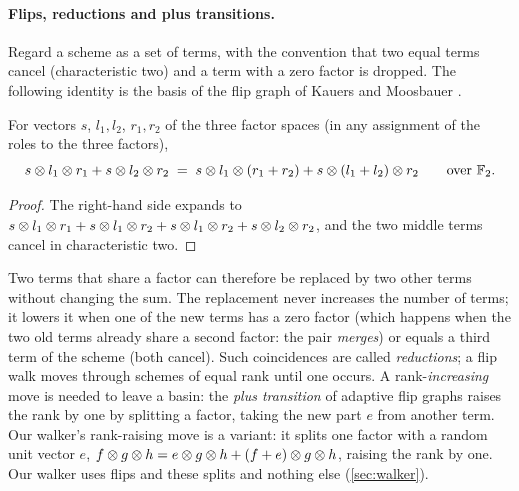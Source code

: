 \paragraph{Flips, reductions and plus transitions.}
Regard a scheme as a set of terms, with the convention that two equal terms cancel (characteristic two) and a term with a zero
factor is dropped. The following identity is the basis of the flip graph of Kauers and Moosbauer \cite{kauers2023flip}.

\begin{lemma}[flip]\label{lem:flip}
For vectors $s$, $l_1,l_2$, $r_1,r_2$ of the three factor spaces (in any assignment of the roles to the three factors),
\[
  s\otimes l_1\otimes r_1 + s\otimes l_2\otimes r_2
  \;=\; s\otimes l_1\otimes (r_1+r_2) + s\otimes (l_1+l_2)\otimes r_2
  \qquad\text{over }{\mathbb{F}_2} .
\]
\end{lemma}
\begin{proof}
The right-hand side expands to $s\otimes l_1\otimes r_1 + s\otimes l_1\otimes r_2 + s\otimes l_1\otimes r_2 + s\otimes l_2\otimes r_2$, and the
two middle terms cancel in characteristic two.
\end{proof}

Two terms that share a factor can therefore be replaced by two other terms without changing the sum. The replacement never
increases the number of terms; it lowers it when one of the new terms has a zero factor (which happens when the two old terms
already share a second factor: the pair \emph{merges}) or equals a third term of the scheme (both cancel). Such coincidences are called
\emph{reductions}; a flip walk moves through schemes of equal rank until one occurs. A rank-\emph{increasing} move is needed to
leave a basin: the \emph{plus transition} of adaptive flip graphs \cite{arai2024adaptive} raises the rank by one by splitting a factor, taking the new part $e$ from another term.
Our walker's rank-raising move is a variant: it splits one factor with a random unit vector $e$,
$f\otimes g\otimes h = e\otimes g\otimes h + (f+e)\otimes g\otimes h$, raising the rank by one.
Our walker uses flips and these splits and nothing else (\cref{sec:walker}).

